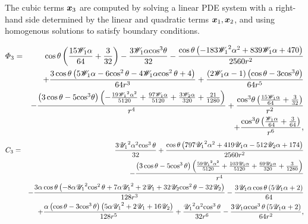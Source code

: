 The cubic terms $\boldsymbol{x}_3$ are computed  by solving a linear PDE system 
with a right-hand side determined by the linear and 
quadratic terms $\boldsymbol{x}_1, \boldsymbol{x}_2$, and using 
homogenous solutions to satisfy boundary conditions.

\begin{eqnarray*}
\varPhi_3 &=& \cos\theta \left(\frac{15 \mathscr{W}_1\alpha}{64} + \frac{3}{32}\right) - \frac{3 \mathscr{W}_1\alpha {\cos}^3\theta}{32} - \frac{\cos\theta \left( - 183 {\mathscr{W}_1}^2\alpha^2 + 839 \mathscr{W}_1\alpha + 470\right)}{2560 r^2} \\ 
&&+ \frac{3 \cos\theta \left(5 \mathscr{W}_1\alpha - 6 {\cos^2\theta} - 4 \mathscr{W}_1\alpha {\cos^2\theta} + 4\right)}{64 r^3} + \frac{\left(2 \mathscr{W}_1\alpha - 1\right) \left(\cos\theta - 3 {\cos}^3\theta\right)}{64 r^5} 
\\ 
&&- \frac{\left(3 \cos\theta - 5 {\cos}^3\theta\right) \left( - \frac{19 {\mathscr{W}_1}^2\alpha^2}{5120} + \frac{97 \mathscr{W}_1\alpha}{5120} + \frac{3 \mathscr{W}_2\alpha}{320} + \frac{21}{1280}\right)}{r^4} + \frac{{\cos}^3\theta \left(\frac{15 \mathscr{W}_1\alpha}{64} + \frac{3}{32}\right)}{r^2} \\ 
&&+ \frac{{\cos}^3\theta \left(\frac{\mathscr{W}_1\alpha}{64} + \frac{3}{64}\right)}{r^6},
\end{eqnarray*}
\begin{eqnarray*}
C_3 &=&
\frac{3 {{\mathscr{U}_1}}^2\alpha^2 {\cos^3\theta}}{32} + \frac{\cos\theta \left(797 {{\mathscr{U}_1}}^2\alpha^2 + 419 {\mathscr{U}_1}\alpha - 512 {\mathscr{U}_2}\alpha + 174\right)}{2560 r^2} \\
&&- \frac{\left(3 \cos\theta - 5 {\cos^3\theta}\right) \left(\frac{59 {{\mathscr{U}_1}}^2\alpha^2}{5120} + \frac{103 {\mathscr{U}_1}\alpha}{5120} + \frac{69 {\mathscr{U}_2}\alpha}{320} + \frac{3}{1280}\right)}{r^4} \\
&&- \frac{3\alpha \cos\theta \left( - 8\alpha {{\mathscr{U}_1}}^2 {\cos^2\theta} + 7\alpha {{\mathscr{U}_1}}^2 + 2 {\mathscr{U}_1} + 32 {\mathscr{U}_2} {\cos^2\theta} - 32 {\mathscr{U}_2}\right)}{128 r^3} - \frac{3 {\mathscr{U}_1}\alpha \cos\theta \left(5 {\mathscr{U}_1}\alpha + 2\right)}{64} \\
&&+ \frac{\alpha \left(\cos\theta - 3 {\cos^3\theta}\right) \left(5\alpha {{\mathscr{U}_1}}^2 + 2 {\mathscr{U}_1} + 16 {\mathscr{U}_2}\right)}{128 r^5} + \frac{{{\mathscr{U}_1}}^2\alpha^2 {\cos^3\theta}}{32 r^6} - \frac{3 {\mathscr{U}_1}\alpha {\cos^3\theta} \left(5 {\mathscr{U}_1}\alpha + 2\right)}{64 r^2},
\end{eqnarray*}
